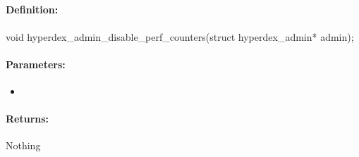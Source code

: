 \pagebreak
\subsection{}
\label{api:c:disable_perf_counters}


\paragraph{Definition:}
\begin{ccode}
void hyperdex_admin_disable_perf_counters(struct hyperdex_admin* admin);
\end{ccode}

\paragraph{Parameters:}
\begin{itemize}[noitemsep]
\item {}\\

\end{itemize}

\paragraph{Returns:}
Nothing